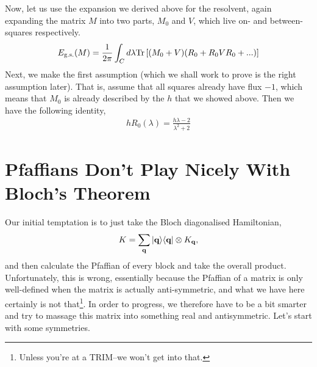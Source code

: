 \documentclass[11pt, oneside]{article} %
\numberwithin{equation}{section}
\begin{document}
Now, let us use the expansion we derived above for the resolvent, again expanding the matrix $M$ into two parts, $M_0$ and $V$, which live on- and between-squares respectively.
\begin{align}
    E_\textup{g.s.}(M) = \frac 1{2\pi} \int_C d\lambda \textup{Tr}\left [
        (M_0 + V)
        (R_0 + R_0 V R_0 + ...)\right ]
\end{align}
Next, we make the first assumption (which we shall work to prove is the right assumption later). That is, assume that all squares already have flux $-1$, which means that $M_0$ is already described by the $h$ that we showed above. Then we have the following identity,
\begin{align}
    h R_0(\lambda) = \frac{ h\lambda - 2}{\lambda^2 + 2}
\end{align} 


\appendix
    
\section{Pfaffians Don't Play Nicely With Bloch's Theorem}

Our initial temptation is to just take the Bloch diagonalised Hamiltonian, 
\begin{align}
    K = \sum_{\textbf q}\ket{\textbf q}\!\bra{\textbf q} \otimes K_{\textbf q},
\end{align}
and then calculate the Pfaffian of every block and take the overall product. Unfortunately, this is wrong, essentially because the Pfaffian of a matrix is only well-defined when the matrix is actually anti-symmetric, and what we have here certainly is not that\footnote{Unless you're at a TRIM--we won't get into that.}. In order to progress, we therefore have to be a bit smarter and try to massage this matrix into something real and antisymmetric. Let's start with some symmetries.
\end{document}
